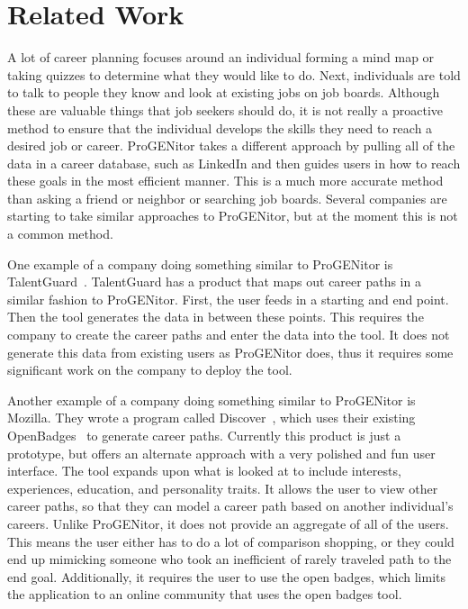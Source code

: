\section{Related Work}
\label{sect:related-work}
A lot of career planning focuses around an individual forming a mind map or
taking quizzes to determine what they would like to do.  Next, individuals
are told to talk to people they know and look at existing jobs on job boards. 
Although these are valuable things that job seekers should do, it is not really
a proactive method to ensure that the individual develops the skills they need
to reach a desired job or career.  ProGENitor takes a different approach by
pulling all of the data in a career database, such as LinkedIn and then guides
users in how to reach these goals in the most efficient manner.  This is a much
more accurate method than asking a friend or neighbor or searching job boards. 
Several companies are starting to take similar approaches to ProGENitor, but at
the moment this is not a common method.

One example of a company doing something similar to ProGENitor is
TalentGuard~\cite{talentguard}.  TalentGuard has a product that maps out career
paths in a similar fashion to ProGENitor.  First, the user feeds in a starting
and end point.  Then the tool generates the data in between these points.  This
requires the company to create the career paths and enter the data into the
tool.  It does not generate this data from existing users as ProGENitor does,
thus it requires some significant work on the company to deploy the tool.

Another example of a company doing something similar to ProGENitor is Mozilla. 
They wrote a program called Discover~\cite{discover}, which uses their existing
OpenBadges~\cite{openbadges} to generate career paths.  Currently this product
is just a prototype, but offers an alternate approach with a very polished and fun
user interface.  The tool expands upon what is looked at to include interests,
experiences, education, and personality traits.  It allows the user to view
other career paths, so that they can model a career path based on another
individual's careers.  Unlike ProGENitor, it does not provide an aggregate of
all of the users.  This means the user either has to do a lot of comparison
shopping, or they could end up mimicking someone who took an
inefficient of rarely traveled path to the end goal.  Additionally, it requires
the user to use the open badges, which limits the application to an online
community that uses the open badges tool.

